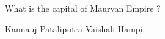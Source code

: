 \documentclass{exam}
\begin{document}
\begin{questions}

\question What is the capital of Mauryan Empire ? 

\begin{choices}
\choice Kannauj 
\choice Pataliputra
\choice Vaishali
\choice Hampi
\end{choices}
\end{questions}
\end{document}
